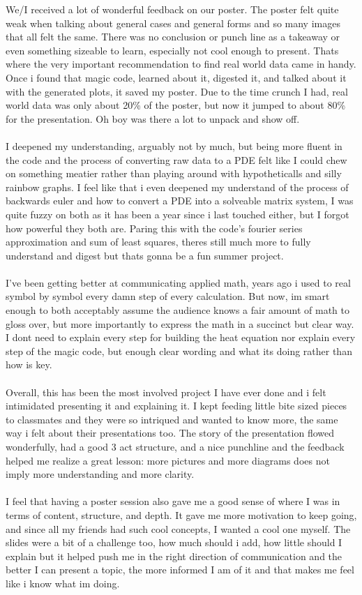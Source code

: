 \documentclass[11pt]{article}
\begin{document}
\begin{onehalfspace}
We/I received a lot of wonderful feedback on our poster. 
The poster felt quite weak when talking about general cases and general forms
and so many images that all felt the same. There was no conclusion or punch line as a takeaway
or even something sizeable to learn, especially not cool enough to present.
Thats where the very important recommendation to find real world data came in handy.
Once i found that magic code, learned about it, digested it, and talked about it with the 
generated plots, it saved my poster. Due to the time crunch I had, real world data
was only about 20\% of the poster, but now it jumped to about 80\% for the presentation.
Oh boy was there a lot to unpack and show off. 
\\\\
I deepened my understanding, arguably not by much, but being more fluent in the code
and the process of converting raw data to a PDE felt like I could chew on something meatier
rather than playing around with hypotheticalls and silly rainbow graphs.
I feel like that i even deepened my understand of the process of backwards euler and how to
convert a PDE into a solveable matrix system, I was quite fuzzy on both as it has been a year
since i last touched either, but I forgot how powerful they both are. Paring this with
the code's fourier series approximation and sum of least squares, theres still much more
to fully understand and digest but thats gonna be a fun summer project.
\\\\
I've been getting better at communicating applied math, years ago i used to real symbol
by symbol every damn step of every calculation. But now, im smart enough to both
acceptably assume the audience knows a fair amount of math to gloss over,
but more importantly to express the math in a succinct but clear way. 
I dont need to explain every step for building the heat equation nor explain every step
of the magic code, but enough clear wording and what its doing rather than how is key.
\\\\
Overall, this has been the most involved project I have ever done and i felt
intimidated presenting it and explaining it. I kept feeding little bite sized pieces
to classmates and they were so intriqued and wanted to know more, the same way i felt
about their presentations too. The story of the presentation flowed wonderfully,
had a good 3 act structure, and a nice punchline and the feedback helped me realize a 
great lesson: more pictures and more diagrams does not imply more understanding and more clarity.
\\\\
I feel that having a poster session also gave me a good sense of where I was in terms
of content, structure, and depth. It gave me more motivation to keep going,
and since all my friends had such cool concepts, I wanted a cool one myself. 
The slides were a bit of a challenge too, how much should i add, how little should I explain
but it helped push me in the right direction of communication and the better I can present
a topic, the more informed I am of it and that makes me feel like i know what im doing.



\end{onehalfspace}
\end{document}
